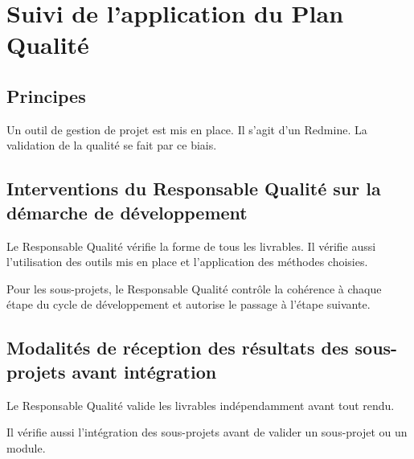 \section{Suivi de l'application du Plan Qualité}

\subsection{Principes}
Un outil de gestion de projet est mis en place. Il s'agit d'un Redmine.
La validation de la qualité se fait par ce biais.

\subsection{Interventions du Responsable Qualité sur la démarche de développement}
Le Responsable Qualité vérifie la forme de tous les livrables. Il vérifie aussi 
l'utilisation des outils mis en place et l'application des méthodes choisies.

Pour les sous-projets, le Responsable Qualité contrôle la cohérence à chaque 
étape du cycle de développement et autorise le passage à l'étape suivante.

\subsection{Modalités de réception des résultats des sous-projets avant intégration}
Le Responsable Qualité valide les livrables indépendamment avant tout rendu.

Il vérifie aussi l'intégration des sous-projets avant de valider un sous-projet 
ou un module.

\vfill
\pagebreak
